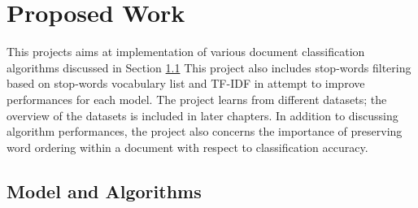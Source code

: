 \documentclass[10pt,twocolumn,letterpaper]{article}
\begin{document}
\section{Proposed Work}
This projects aims at implementation of various document classification algorithms discussed in Section \ref{model}
This project also includes stop-words filtering based on stop-words vocabulary list and TF-IDF in attempt to improve performances for each model. The project learns from different datasets; the overview of the datasets is included in later chapters. In addition to discussing algorithm performances, the project also concerns the importance of preserving word ordering within a document with respect to classification accuracy. 
\subsection{Model and Algorithms}\label{model}
\end{document}
